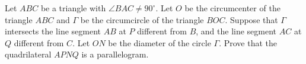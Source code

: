 Let $ABC$ be a triangle with $\angle BAC \neq 90^{\circ}$. Let $O$ be the circumcenter of the triangle $ABC$ and $\Gamma$ be the circumcircle of the triangle $BOC$. Suppose that $\Gamma$ intersects the line segment $AB$ at $P$ different from $B$, and the line segment $AC$ at $Q$ different from $C$. Let $ON$ be the diameter of the circle $\Gamma$. Prove that the quadrilateral $APNQ$ is a parallelogram.